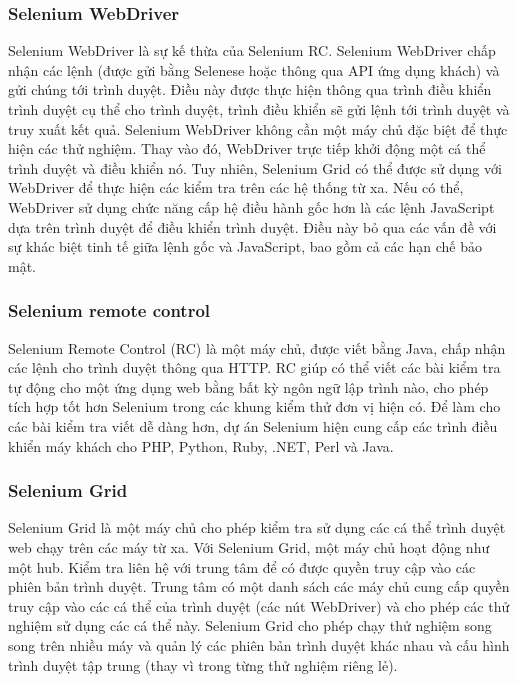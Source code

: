 \subsubsection{Selenium WebDriver}
Selenium WebDriver là sự kế thừa của Selenium RC. Selenium WebDriver chấp nhận các lệnh (được gửi bằng Selenese hoặc thông qua API ứng dụng khách) và gửi chúng tới trình duyệt. Điều này được thực hiện thông qua trình điều khiển trình duyệt cụ thể cho trình duyệt, trình điều khiển sẽ gửi lệnh tới trình duyệt và truy xuất kết quả. Selenium WebDriver không cần một máy chủ đặc biệt để thực hiện các thử nghiệm. Thay vào đó, WebDriver trực tiếp khởi động một cá thể trình duyệt và điều khiển nó. Tuy nhiên, Selenium Grid có thể được sử dụng với WebDriver để thực hiện các kiểm tra trên các hệ thống từ xa. Nếu có thể, WebDriver sử dụng chức năng cấp hệ điều hành gốc hơn là các lệnh JavaScript dựa trên trình duyệt để điều khiển trình duyệt. Điều này bỏ qua các vấn đề với sự khác biệt tinh tế giữa lệnh gốc và JavaScript, bao gồm cả các hạn chế bảo mật.
\subsubsection{Selenium remote control}
Selenium Remote Control (RC) là một máy chủ, được viết bằng Java, chấp nhận các lệnh cho trình duyệt thông qua HTTP. RC giúp có thể viết các bài kiểm tra tự động cho một ứng dụng web bằng bất kỳ ngôn ngữ lập trình nào, cho phép tích hợp tốt hơn Selenium trong các khung kiểm thử đơn vị hiện có. Để làm cho các bài kiểm tra viết dễ dàng hơn, dự án Selenium hiện cung cấp các trình điều khiển máy khách cho PHP, Python, Ruby, .NET, Perl và Java.
\subsubsection{Selenium Grid}
Selenium Grid là một máy chủ cho phép kiểm tra sử dụng các cá thể trình duyệt web chạy trên các máy từ xa. Với Selenium Grid, một máy chủ hoạt động như một hub. Kiểm tra liên hệ với trung tâm để có được quyền truy cập vào các phiên bản trình duyệt. Trung tâm có một danh sách các máy chủ cung cấp quyền truy cập vào các cá thể của trình duyệt (các nút WebDriver) và cho phép các thử nghiệm sử dụng các cá thể này. Selenium Grid cho phép chạy thử nghiệm song song trên nhiều máy và quản lý các phiên bản trình duyệt khác nhau và cấu hình trình duyệt tập trung (thay vì trong từng thử nghiệm riêng lẻ).

